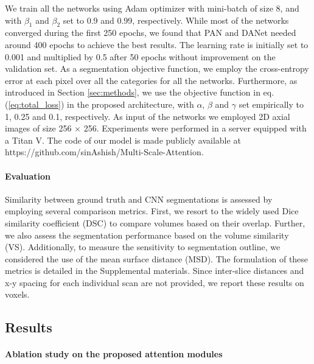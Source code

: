 \documentclass[journal]{IEEEtran}
\begin{document}
We train all the networks using Adam optimizer with mini-batch of size 8, and with $\beta_1$ and $\beta_2$ set to 0.9 and 0.99, respectively. While most of the networks converged during the first 250 epochs, we found that PAN \cite{li2018pyramid} and DANet \cite{fu2018dual} needed around 400 epochs to achieve the best results. The learning rate is initially set to 0.001 and multiplied by 0.5 after 50 epochs without improvement on the validation set. As a segmentation objective function, we employ the cross-entropy error at each pixel over all the categories for all the networks. Furthermore, as introduced in Section \ref{sec:methods}, we use the objective function in eq. (\ref{eq:total_loss}) in the proposed architecture, with $\alpha$, $\beta$ and $\gamma$ set empirically to 1, 0.25 and 0.1, respectively. As input of the networks we employed 2D axial images of size 256 $\times$ 256. Experiments were performed in a server equipped with a Titan V. The code of our model is made publicly available at https://github.com/sinAshish/Multi-Scale-Attention.



\paragraph*{\textbf{Evaluation}}

Similarity between ground truth and CNN segmentations is assessed by employing several comparison metrics. First, we resort to the widely used Dice similarity coefficient (DSC) to compare volumes based on their overlap. Further, we also assess the segmentation performance based on the volume similarity (VS). Additionally, to measure the sensitivity to segmentation outline, we considered the use of the mean surface distance (MSD). The formulation of these metrics is detailed in the Supplemental materials. Since inter-slice distances and x-y spacing for each individual scan are not provided, we report these results on voxels. 


\subsection{\textbf{Results}}

\paragraph*{\textbf{Ablation study on the proposed attention modules}}
\end{document}

